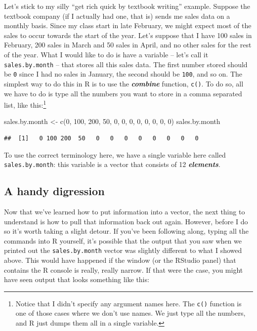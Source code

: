 \documentclass[
]{book}
\newenvironment{Shaded}{\begin{snugshade}}{\end{snugshade}}
\newcommand{\DecValTok}[1]{\textcolor[rgb]{0.00,0.00,0.81}{#1}}
\newcommand{\FunctionTok}[1]{\textcolor[rgb]{0.00,0.00,0.00}{#1}}
\newcommand{\NormalTok}[1]{#1}
\newcommand{\OtherTok}[1]{\textcolor[rgb]{0.56,0.35,0.01}{#1}}
\begin{document}
Let's stick to my silly ``get rich quick by textbook writing'' example. Suppose the textbook company (if I actually had one, that is) sends me sales data on a monthly basis. Since my class start in late February, we might expect most of the sales to occur towards the start of the year. Let's suppose that I have 100 sales in February, 200 sales in March and 50 sales in April, and no other sales for the rest of the year. What I would like to do is have a variable -- let's call it \texttt{sales.by.month} -- that stores all this sales data. The first number stored should be \texttt{0} since I had no sales in January, the second should be \texttt{100}, and so on. The simplest way to do this in R is to use the \textbf{\emph{combine}} function, \texttt{c()}. To do so, all we have to do is type all the numbers you want to store in a comma separated list, like this:\footnote{Notice that I didn't specify any argument names here. The \texttt{c()} function is one of those cases where we don't use names. We just type all the numbers, and R just dumps them all in a single variable.}

\begin{Shaded}
\begin{Highlighting}[]
\NormalTok{sales.by.month }\OtherTok{\textless{}{-}} \FunctionTok{c}\NormalTok{(}\DecValTok{0}\NormalTok{, }\DecValTok{100}\NormalTok{, }\DecValTok{200}\NormalTok{, }\DecValTok{50}\NormalTok{, }\DecValTok{0}\NormalTok{, }\DecValTok{0}\NormalTok{, }\DecValTok{0}\NormalTok{, }\DecValTok{0}\NormalTok{, }\DecValTok{0}\NormalTok{, }\DecValTok{0}\NormalTok{, }\DecValTok{0}\NormalTok{, }\DecValTok{0}\NormalTok{)}
\NormalTok{sales.by.month}
\end{Highlighting}
\end{Shaded}

\begin{verbatim}
##  [1]   0 100 200  50   0   0   0   0   0   0   0   0
\end{verbatim}

To use the correct terminology here, we have a single variable here called \texttt{sales.by.month}: this variable is a vector that consists of 12 \textbf{\emph{elements}}.

\hypertarget{a-handy-digression}{%
\subsection{A handy digression}\label{a-handy-digression}}

Now that we've learned how to put information into a vector, the next thing to understand is how to pull that information back out again. However, before I do so it's worth taking a slight detour. If you've been following along, typing all the commands into R yourself, it's possible that the output that you saw when we printed out the \texttt{sales.by.month} vector was slightly different to what I showed above. This would have happened if the window (or the RStudio panel) that contains the R console is really, really narrow. If that were the case, you might have seen output that looks something like this:
\end{document}
